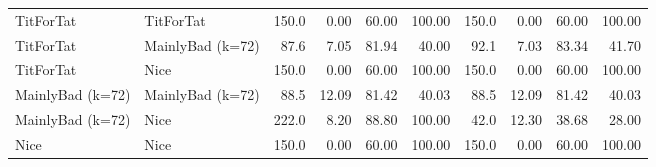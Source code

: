 \documentclass[journal,a4paper,10pt,twoside]{IEEEtran} %
\begin{document}
\begin{table}[ht]
\begin{tabular}{ll|rrrr|rrrr}
		TitForTat         & TitForTat         & 150.0 &  0.00 &  60.00 &     100.00 & 150.0 &  0.00 &  60.00 &     100.00 \\
		TitForTat         & MainlyBad (k=72)  &  87.6 &  7.05 &  81.94 &      40.00 &  92.1 &  7.03 &  83.34 &      41.70 \\
		TitForTat         & Nice              & 150.0 &  0.00 &  60.00 &     100.00 & 150.0 &  0.00 &  60.00 &     100.00 \\
		MainlyBad (k=72)  & MainlyBad (k=72)  &  88.5 & 12.09 &  81.42 &      40.03 &  88.5 & 12.09 &  81.42 &      40.03 \\
		MainlyBad (k=72)  & Nice              & 222.0 &  8.20 &  88.80 &     100.00 &  42.0 & 12.30 &  38.68 &      28.00 \\
		Nice              & Nice              & 150.0 &  0.00 &  60.00 &     100.00 & 150.0 &  0.00 &  60.00 &     100.00 \\ \bottomrule
	\end{tabular}
\end{table}
\end{document}
